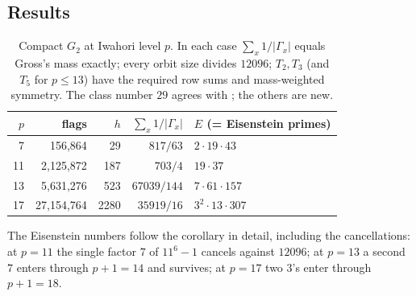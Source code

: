 \documentclass[11pt]{amsart}
\theoremstyle{definition}
\begin{document}
\subsection{Results}
\begin{table}[h]\centering\small
\begin{tabular}{@{}rrrrl@{}}\toprule
$p$ & flags & $h$ & $\sum_x1/|\Gamma_x|$ & $E$ (= Eisenstein primes)\\\midrule
7 & 156{,}864 & 29 & $817/63$ & $2\cdot19\cdot43$\\
11 & 2{,}125{,}872 & 187 & $703/4$ & $19\cdot37$\\
13 & 5{,}631{,}276 & 523 & $67039/144$ & $7\cdot61\cdot157$\\
17 & 27{,}154{,}764 & 2280 & $35919/16$ & $3^2\cdot13\cdot307$\\\bottomrule
\end{tabular}
\caption{Compact $G_2$ at Iwahori level $p$. In each case $\sum_x1/|\Gamma_x|$ equals Gross's mass exactly; every orbit size divides $12096$; $T_2,T_3$ (and $T_5$ for $p\le13$) have the required row sums and mass-weighted symmetry. The class number $29$ agrees with \cite{LP}; the others are new.}
\end{table}
The Eisenstein numbers follow the corollary in detail, including the cancellations: at $p=11$ the single factor $7$ of $11^6-1$ cancels against $12096$; at $p=13$ a second $7$ enters through $p+1=14$ and survives; at $p=17$ two $3$'s enter through $p+1=18$.
\end{document}
